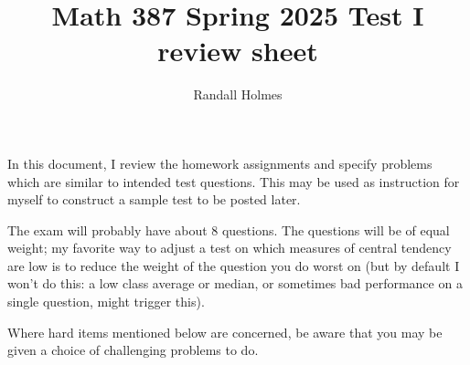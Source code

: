 \documentclass[12pt]{article}
\title{Math 387 Spring 2025 Test I review sheet}
\author{Randall Holmes}
\begin{document}
\maketitle

In this document, I review the homework assignments and specify problems which are similar to intended test questions.
This may be used as instruction for myself to construct a sample test to be posted later.

The exam will probably have about 8 questions.  The questions will be of equal weight;  my favorite way to adjust a test on which measures of central tendency are low is to reduce the weight of the question you do worst on (but by default I won't do this:  a low class average or median, or sometimes bad performance on a single question, might trigger this).

Where hard items mentioned below are concerned, be aware that you may be given a choice of challenging problems to do.
\end{document}
